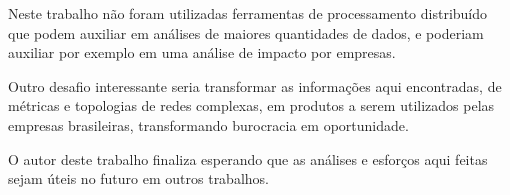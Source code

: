 Neste trabalho não foram utilizadas ferramentas de processamento distribuído que podem auxiliar em análises de maiores quantidades de dados, e poderiam auxiliar por exemplo em uma análise de impacto por empresas.

Outro desafio interessante seria transformar as informações aqui encontradas, de métricas e topologias de redes complexas, em produtos a serem utilizados pelas empresas brasileiras, transformando burocracia em oportunidade.

O autor deste trabalho finaliza esperando que as análises e esforços aqui feitas sejam úteis no futuro em outros trabalhos.
